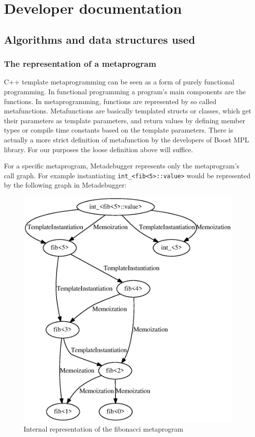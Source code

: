 
\chapter{Developer documentation}

\section{Algorithms and data structures used}

\subsection{The representation of a metaprogram}

C++ template metaprogramming can be seen as a form of purely functional
programming. \cite{mihalicza-phd} In functional programming a program's main
components are the functions. In metaprogramming, functions are represented by
so called metafunctions. Metafunctions are basically templated structs or
classes, which get their parameters as template parameters, and return values
by defining member types or compile time constants based on the template
parameters. There is actually a more strict
definition\cite{boost-mpl-metafunction} of metafunction by the developers of
Boost MPL library\cite{boost-mpl}. For our purposes the loose definition above
will suffice.

For a specific metaprogram, Metadebugger represents only the metaprogram's call
graph. For example instantiating \texttt{int\_<fib<5>::value>} would be
represented by the following graph in Metadebugger:

\begin{figure}[H]
    \includegraphics[width=\textwidth]{img/fib5_call_graph.eps}
    \caption{Internal representation of the fibonacci metaprogram}
\end{figure}

